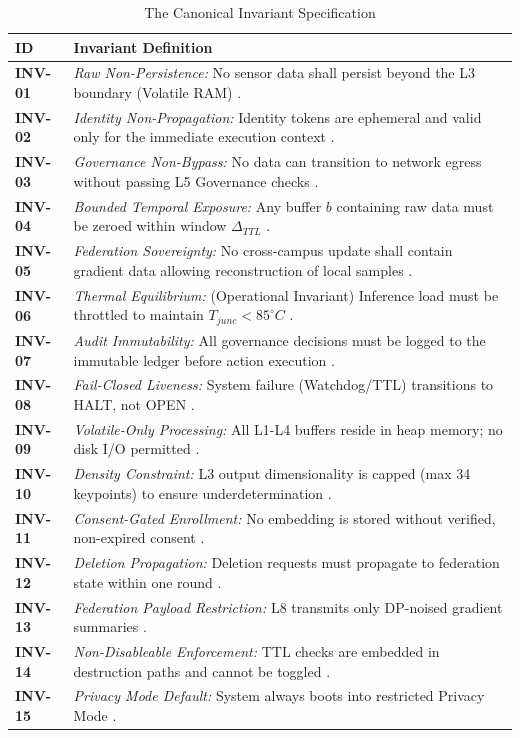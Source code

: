 \documentclass[conference]{IEEEtran}
\theoremstyle{definition}
\begin{document}
\begin{table}[htbp]
\caption{The Canonical Invariant Specification}
\begin{center}
\begin{tabular}{p{1.2cm} p{6.8cm}}
\toprule
\textbf{ID} & \textbf{Invariant Definition} \\
\midrule
\textbf{INV-01} & \textit{Raw Non-Persistence:} No sensor data shall persist beyond the L3 boundary (Volatile RAM) \cite{P17, P18}. \\
\midrule
\textbf{INV-02} & \textit{Identity Non-Propagation:} Identity tokens are ephemeral and valid only for the immediate execution context \cite{P1, P3, P9}. \\
\midrule
\textbf{INV-03} & \textit{Governance Non-Bypass:} No data can transition to network egress without passing L5 Governance checks \cite{P9}. \\
\midrule
\textbf{INV-04} & \textit{Bounded Temporal Exposure:} Any buffer $b$ containing raw data must be zeroed within window $\Delta_{TTL}$ \cite{P19}. \\
\midrule
\textbf{INV-05} & \textit{Federation Sovereignty:} No cross-campus update shall contain gradient data allowing reconstruction of local samples \cite{P14}. \\
\midrule
\textbf{INV-06} & \textit{Thermal Equilibrium:} (Operational Invariant) Inference load must be throttled to maintain $T_{junc} < 85^{\circ}C$ \cite{P5, P11}. \\
\midrule
\textbf{INV-07} & \textit{Audit Immutability:} All governance decisions must be logged to the immutable ledger before action execution \cite{P8}. \\
\midrule
\textbf{INV-08} & \textit{Fail-Closed Liveness:} System failure (Watchdog/TTL) transitions to HALT, not OPEN \cite{P11}. \\
\midrule
\textbf{INV-09} & \textit{Volatile-Only Processing:} All L1-L4 buffers reside in heap memory; no disk I/O permitted \cite{P12}. \\
\midrule
\textbf{INV-10} & \textit{Density Constraint:} L3 output dimensionality is capped (max 34 keypoints) to ensure underdetermination \cite{P3}. \\
\midrule
\textbf{INV-11} & \textit{Consent-Gated Enrollment:} No embedding is stored without verified, non-expired consent \cite{P8}. \\
\midrule
\textbf{INV-12} & \textit{Deletion Propagation:} Deletion requests must propagate to federation state within one round \cite{P14}. \\
\midrule
\textbf{INV-13} & \textit{Federation Payload Restriction:} L8 transmits only DP-noised gradient summaries \cite{P13}. \\
\midrule
\textbf{INV-14} & \textit{Non-Disableable Enforcement:} TTL checks are embedded in destruction paths and cannot be toggled \cite{P18}. \\
\midrule
\textbf{INV-15} & \textit{Privacy Mode Default:} System always boots into restricted Privacy Mode \cite{P11}. \\
\bottomrule
\end{tabular}
\end{center}
\end{table}
\end{document}

